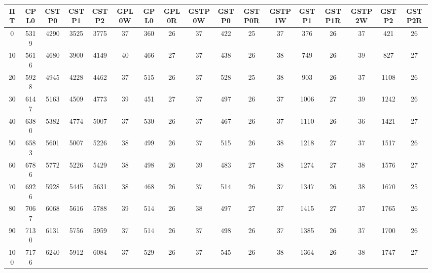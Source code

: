 \begin{tabular}{|c|c|c|c|c|c|c|c|c|c|c|c|c|c|c|c|c|}
\hline
ΠΤ&CPL0&CSTP0&CSTP1&CSTP2&GPL0W&GPL0&GPL0R&GSTP0W&GSTP0&GSTP0R&GSTP1W&GSTP1&GSTP1R&GSTP2W&GSTP2&GSTP2R\\
\hline
\hline
0&5319&4290&3525&3775&37&360&26&37&422&25&37&376&26&37&421&26\\
\hline
10&5616&4680&3900&4149&40&466&27&37&438&26&38&749&26&39&827&27\\
\hline
20&5928&4945&4228&4462&37&515&26&37&528&25&38&903&26&37&1108&26\\
\hline
30&6147&5163&4509&4773&39&451&27&37&497&26&37&1006&27&39&1242&26\\
\hline
40&6380&5382&4774&5007&37&530&26&37&467&26&37&1110&26&36&1421&27\\
\hline
50&6583&5601&5007&5226&38&499&26&37&515&26&38&1218&27&37&1517&26\\
\hline
60&6786&5772&5226&5429&38&498&26&39&483&27&38&1274&27&38&1576&27\\
\hline
70&6926&5928&5445&5631&38&468&26&37&514&26&37&1347&26&38&1670&25\\
\hline
80&7067&6068&5616&5788&39&514&26&38&497&27&37&1415&27&37&1765&26\\
\hline
90&7130&6131&5756&5959&37&514&26&37&498&26&37&1385&26&37&1700&26\\
\hline
100&7176&6240&5912&6084&37&529&26&37&545&26&38&1364&26&38&1747&27\\
\hline
\end{tabular}
